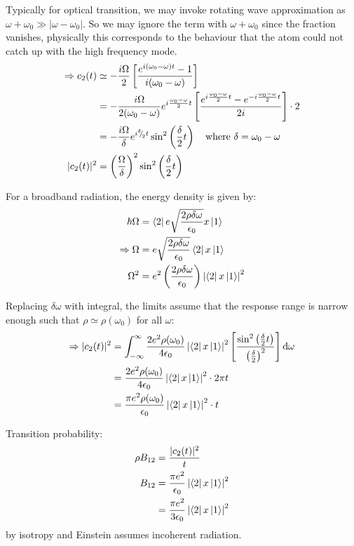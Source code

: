 \begin{parts}
	Typically for optical transition, we may invoke rotating wave approximation as $\omega + \omega_0 \gg |\omega - \omega_0|$.
	So we may ignore the term with $\omega + \omega_0$ since the fraction vanishes, physically this corresponds to the behaviour that the atom could not catch up with the high frequency mode.
	\begin{align*}
		\Rightarrow c_2(t) &\simeq -\frac{i\Omega}{2} \left[\frac{e^{i(\omega_0 - \omega)t}-1}{i(\omega_0 - \omega)}\right] \\
		&= -\frac{i\Omega}{2(\omega_0 - \omega)} e^{i\frac{\omega_0 - \omega}{2}t} \left[\frac{e^{i\frac{\omega_0 - \omega}{2}t} - e^{-i\frac{\omega_0 - \omega}{2}t}}{2i}\right] \cdot 2 \\
		&= -\frac{i\Omega}{\delta} e^{i{{}^{\delta}{\mskip -5mu/\mskip -3mu}_{2}}t} \sin^2\left(\frac{\delta}{2}t\right) \textnormal{\hspace{1em}where } \delta=\omega_0 - \omega \\
		|c_2(t)|^2 &= \left(\frac{\Omega}{\delta}\right)^2 \sin^2\left(\frac{\delta}{2}t\right)
	\end{align*}
	
	For a broadband radiation, the energy density is given by:
	\begin{align*}
		\hbar\Omega &= \bra{2}e\sqrt{\frac{2\rho\delta\omega}{\epsilon_{0}}}x\ket{1} \\
		\Rightarrow \Omega &= e\sqrt{\frac{2\rho\delta\omega}{\epsilon_{0}}} \bra{2}x\ket{1} \\
		\Omega^2 &= e^2 \left(\frac{2\rho\delta\omega}{\epsilon_{0}}\right) \left|\bra{2}x\ket{1}\right|^2
	\end{align*}
	
	Replacing $\delta\omega$ with integral, the limits assume that the response range is narrow enough such that $\rho\simeq\rho(\omega_0)$ for all $\omega$:
	\begin{align*}
		\Rightarrow |c_2(t)|^2 &= \int_{-\infty}^{\infty} {\frac{2e^2\rho(\omega_0)}{4\epsilon_{0}} \left|\bra{2}x\ket{1}\right|^2 \left[\frac{\sin^2\left(\frac{\delta}{2}t\right)}{\left(\frac{\delta}{2}\right)^2}\right]} \,\mathrm{d}{\omega} \\
		&= \frac{2e^2\rho(\omega_0)}{4\epsilon_{0}} \left|\bra{2}x\ket{1}\right|^2 \cdot 2\pi t \\
		&= \frac{\pi e^2\rho(\omega_0)}{\epsilon_{0}} \left|\bra{2}x\ket{1}\right|^2 \cdot t
	\end{align*}
	
	Transition probability:
	\begin{align*}
		\rho B_{12} &= \frac{|c_2(t)|^2}{t} \\
		B_{12} &= \frac{\pi e^2}{\epsilon_{0}} \left|\bra{2}x\ket{1}\right|^2 \\
		&= \frac{\pi e^2}{3\epsilon_{0}} \left|\bra{2}x\ket{1}\right|^2
	\end{align*}
	by isotropy and Einstein assumes incoherent radiation.
\end{parts}